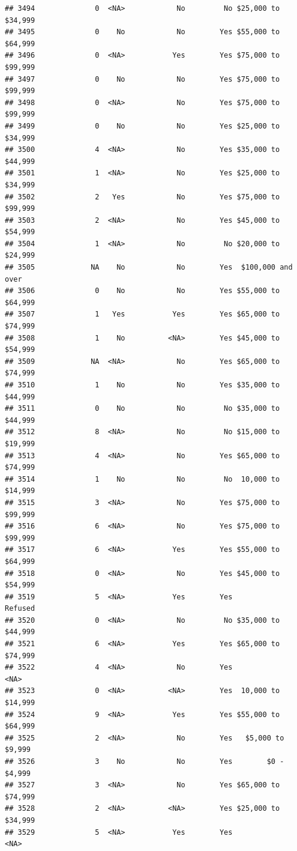 \documentclass[man]{apa6}
\begin{document}
\begin{verbatim}
## 3494              0  <NA>            No         No $25,000 to $34,999
## 3495              0    No            No        Yes $55,000 to $64,999
## 3496              0  <NA>           Yes        Yes $75,000 to $99,999
## 3497              0    No            No        Yes $75,000 to $99,999
## 3498              0  <NA>            No        Yes $75,000 to $99,999
## 3499              0    No            No        Yes $25,000 to $34,999
## 3500              4  <NA>            No        Yes $35,000 to $44,999
## 3501              1  <NA>            No        Yes $25,000 to $34,999
## 3502              2   Yes            No        Yes $75,000 to $99,999
## 3503              2  <NA>            No        Yes $45,000 to $54,999
## 3504              1  <NA>            No         No $20,000 to $24,999
## 3505             NA    No            No        Yes  $100,000 and over
## 3506              0    No            No        Yes $55,000 to $64,999
## 3507              1   Yes           Yes        Yes $65,000 to $74,999
## 3508              1    No          <NA>        Yes $45,000 to $54,999
## 3509             NA  <NA>            No        Yes $65,000 to $74,999
## 3510              1    No            No        Yes $35,000 to $44,999
## 3511              0    No            No         No $35,000 to $44,999
## 3512              8  <NA>            No         No $15,000 to $19,999
## 3513              4  <NA>            No        Yes $65,000 to $74,999
## 3514              1    No            No         No  10,000 to $14,999
## 3515              3  <NA>            No        Yes $75,000 to $99,999
## 3516              6  <NA>            No        Yes $75,000 to $99,999
## 3517              6  <NA>           Yes        Yes $55,000 to $64,999
## 3518              0  <NA>            No        Yes $45,000 to $54,999
## 3519              5  <NA>           Yes        Yes            Refused
## 3520              0  <NA>            No         No $35,000 to $44,999
## 3521              6  <NA>           Yes        Yes $65,000 to $74,999
## 3522              4  <NA>            No        Yes               <NA>
## 3523              0  <NA>          <NA>        Yes  10,000 to $14,999
## 3524              9  <NA>           Yes        Yes $55,000 to $64,999
## 3525              2  <NA>            No        Yes   $5,000 to $9,999
## 3526              3    No            No        Yes        $0 - $4,999
## 3527              3  <NA>            No        Yes $65,000 to $74,999
## 3528              2  <NA>          <NA>        Yes $25,000 to $34,999
## 3529              5  <NA>           Yes        Yes               <NA>

\end{verbatim}
\end{document}
